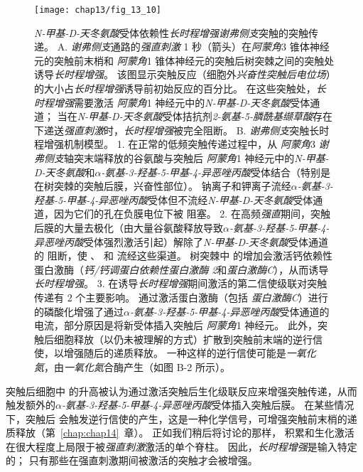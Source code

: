\begin{figure}[htbp]
	\centering
	\texttt{[image: chap13/fig\_13\_10]}
	\caption{\textit{N-甲基-D-天冬氨酸}受体依赖性\textit{长时程增强}\textit{谢弗侧支}突触的突触传递。
		A. \textit{谢弗侧支}通路的\textit{强直刺激} 1 秒（箭头）在\textit{阿蒙角}3 锥体神经元的突触前末梢和 \textit{阿蒙角}1 锥体神经元的突触后树突棘之间的突触处诱导\textit{长时程增强}。
		该图显示突触反应（细胞外\textit{兴奋性突触后电位场}）的大小占\textit{长时程增强}诱导前初始反应的百分比。
		在这些突触处，\textit{长时程增强}需要激活 \textit{阿蒙角}1 神经元中的\textit{N-甲基-D-天冬氨酸}受体通道； 
		当在\textit{N-甲基-D-天冬氨酸}受体拮抗剂\textit{2-氨基-5-膦酰基缬草酸}存在下递送\textit{强直刺激}时，\textit{长时程增强}被完全阻断\cite{morgan2001electrical}。
		B. \textit{谢弗侧支}突触长时程增强机制模型。
		1. 在正常的低频突触传递过程中，从 \textit{阿蒙角}3 \textit{谢弗侧支}轴突末端释放的谷氨酸与突触后 \textit{阿蒙角}1 神经元中的\textit{N-甲基-D-天冬氨酸}和\textit{$\alpha$-氨基-3-羟基-5-甲基-4-异恶唑丙酸}受体结合（特别是在树突棘的突触后膜，兴奋性部位）。
		钠离子和钾离子流经\textit{$\alpha$-氨基-3-羟基-5-甲基-4-异恶唑丙酸}受体但不流经\textit{N-甲基-D-天冬氨酸}受体通道，因为它们的孔在负膜电位下被  阻塞。
		2. 在高频\textit{强直}期间，突触后膜的大量去极化（由大量谷氨酸释放导致\textit{$\alpha$-氨基-3-羟基-5-甲基-4-异恶唑丙酸}受体强烈激活引起）解除了\textit{N-甲基-D-天冬氨酸}受体通道的  阻断，使 、 和  流经这些渠道。
		树突棘中  的增加会激活钙依赖性蛋白激酶（\textit{钙/钙调蛋白依赖性蛋白激酶 2}和\textit{蛋白激酶C}），从而诱导\textit{长时程增强}。
		3. 在诱导\textit{长时程增强}期间激活的第二信使级联对突触传递有 2 个主要影响。
		通过激活蛋白激酶（包括 \textit{蛋白激酶C}）进行的磷酸化增强了通过\textit{$\alpha$-氨基-3-羟基-5-甲基-4-异恶唑丙酸}受体通道的电流，部分原因是将新受体插入突触后 \textit{阿蒙角}1 神经元。
		此外，突触后细胞释放（以仍未被理解的方式）扩散到突触前末端的逆行信使，以增强随后的递质释放。
		一种这样的逆行信使可能是\textit{一氧化氮}，由\textit{一氧化氮}合酶产生（如图 B-2 所示）。}
	\label{fig:13_10}
\end{figure}


突触后细胞中  的升高被认为通过激活突触后生化级联反应来增强突触传递，从而触发额外的\textit{$\alpha$-氨基-3-羟基-5-甲基-4-异恶唑丙酸}受体插入突触后膜。
在某些情况下，突触后  会触发逆行信使的产生，这是一种化学信号，可增强突触前末梢的递质释放（第~\ref{chap:chap14}~章）。
正如我们稍后将讨论的那样， 积累和生化激活在很大程度上局限于被\textit{强直刺激}激活的单个脊柱。
因此，\textit{长时程增强}是输入特定的；
只有那些在强直刺激期间被激活的突触才会被增强。


